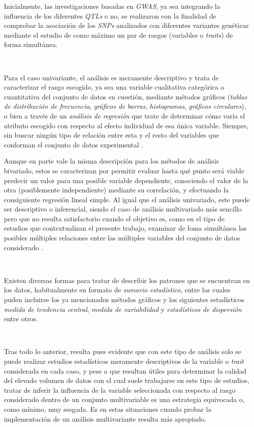 \documentclass[IB,BIB]{TFUOC}%
\begin{document}
Inicialmente, las investigaciones basadas en \textit{GWAS}, ya sea integrando la influencia de los diferentes \textit{QTLs} o no, se realizaron con la finalidad de comprobar la asociación de los \textit{SNPs} analizados con diferentes variantes genéticas mediante el estudio de como máximo un par de rasgos (variables o \textit{traits}) de forma simultánea.

\

Para el caso univariante, el análisis es meramente descriptivo y trata de caracterizar el rasgo escogido, ya sea una variable cualitativa categórica o cuantitativa del conjunto de datos en cuestión, mediante métodos gráficos (\textit{\gls{tablas de distribución de frecuencia}}, \textit{\gls{gráficos de barras}}, \textit{\gls{histogramas}},
\textit{\gls{gráficos circulares}}), o bien a través de un \textit{\gls{análisis de regresión}} que trate de determinar cómo varía el atributo escogido con respecto al efecto individual de esa única variable. Siempre, sin buscar ningún tipo de relación entre esta y el resto del variables que conforman el conjunto de datos experimental \cite{everitt_cambridge_1998, noauthor_univariate_nodate}.

Aunque en parte vale la misma descripción para los métodos de análisis bivariado, estos se caracterizan por permitir evaluar hasta qué punto será viable predecir un valor para una posible variable dependiente, conociendo el valor de la otra (posiblemente independiente) mediante su correlación, y efectuando la consiguiente regresión lineal simple. Al igual que el análisis univariado, este puede ser descriptivo o inferencial, siendo el caso de análisis multivariado más sencillo pero que no resulta satisfactorio cuando el objetivo es, como en el tipo de estudios que contextualizan el presente trabajo, examinar de foma simultánea las posibles múltiples relaciones entre las múltiples variables del conjunto de datos considerado \cite{everitt_cambridge_1998, noauthor_bivariate_nodate}.

\

Existen diversas formas para tratar de describir los patrones que se encuentran en los datos, habitualmente en formato de \textit{\gls{sumario estadístico}}, entre las cuales puden incluirse los ya mencionados métodos gráficos y los siguientes estadísticos \textit{\gls{medida de tendencia central}}, \textit{\gls{medida de variabilidad}} y 
\textit{\gls{estadísticos de dispersión}} entre otros.

\

Tras todo lo anterior, resulta pues evidente que con este tipo de análisis solo se puede realizar estudios estadísticos meramente descriptivos de la variable o \textit{trait} considerada en cada caso, y pese a que resultan útiles para determinar la calidad del elevado volumen de datos con el cual suele trabajarse en este tipo de estudios, tratar de inferir la influencia de la variable seleccionada con respecto al rasgo considerado dentro de un conjunto multivariable es una estrategia equivocada o, como mínimo, muy sesgada. Es en estas situaciones cuando probar la implementación de un análisis multivariante resulta más apropiado.
\end{document}
